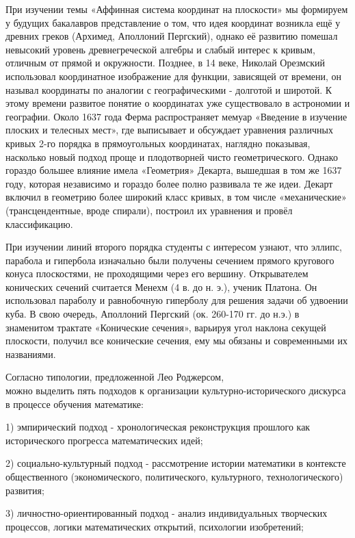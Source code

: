 При изучении темы «Аффинная система координат на плоскости» мы формируем у будущих бакалавров представление о том, что идея координат возникла ещё у древних греков (Архимед, Аполлоний Пергский), однако её развитию помешал невысокий уровень древнегреческой алгебры и слабый интерес к кривым, отличным от прямой и окружности. Позднее, в 14 веке, Николай Орезмский использовал координатное изображение для функции, зависящей от времени, он называл координаты по аналогии с географическими - долготой и широтой. К этому времени развитое понятие о координатах уже существовало в астрономии и географии. Около 1637 года Ферма распространяет мемуар «Введение в изучение плоских и телесных мест», где выписывает и обсуждает уравнения различных кривых 2-го порядка в прямоугольных координатах, наглядно показывая, насколько новый подход проще и плодотворней чисто геометрического. Однако гораздо большее влияние имела «Геометрия» Декарта, вышедшая в том же 1637 году, которая независимо и гораздо более полно развивала те же идеи. Декарт включил в геометрию более широкий класс кривых, в том числе «механические» (трансцендентные, вроде спирали), построил их уравнения и провёл классификацию.

При изучении линий второго порядка студенты с интересом узнают, что эллипс, парабола и гипербола изначально были получены сечением прямого кругового конуса плоскостями, не проходящими через его вершину. Открывателем конических сечений считается Менехм (4 в. до н. э.), ученик Платона. Он использовал параболу и равнобочную гиперболу для решения задачи об удвоении куба. В свою очередь, Аполлоний Пергский (ок. 260-170 гг. до н.э.) в знаменитом трактате «Конические сечения», варьируя угол наклона секущей плоскости, получил все конические сечения, ему мы обязаны и современными их названиями.

Согласно типологии, предложенной Лео Роджерсом, \\можно выделить пять подходов к организации культурно-исторического дискурса в процессе обучения математике:

1) эмпирический подход - хронологическая реконструкция прошлого как исторического прогресса математических идей;

2) социально-культурный подход - рассмотрение истории математики в контексте общественного (экономического, политического, культурного, технологического) развития;

3) личностно-ориентированный подход - анализ индивидуальных творческих процессов, логики математических открытий, психологии изобретений;

